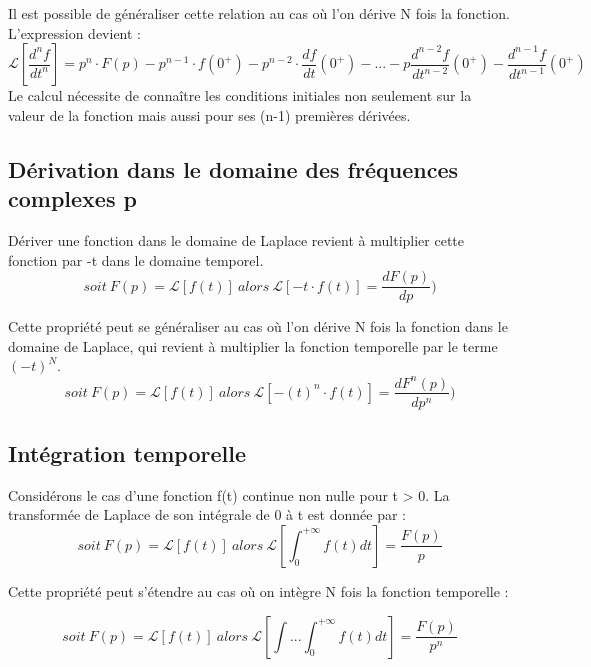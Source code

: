 	Il est possible de généraliser cette relation au cas où l'on dérive N
	fois la fonction. L'expression devient :
	\begin{equation}\label{key}
	\mathcal{L}[\frac{d^{n}f}{dt^{n}}] = p^{n}\cdot F(p)-p^{n-1}\cdot f(0^{+})-p^{n-2}\cdot \frac{df}{dt}(0^{+})-...-p\frac{d^{n-2}f}{dt^{n-2}}(0^{+})-\frac{d^{n-1}f}{dt^{n-1}}(0^{+})
	\end{equation}
	Le calcul nécessite de connaître les conditions initiales non seulement sur la valeur de la fonction mais aussi pour ses (n-1) premières dérivées.
	
	\subsection{Dérivation dans le domaine des fréquences complexes p}
	Dériver une fonction dans le domaine de Laplace revient à multiplier cette fonction par -t dans le domaine temporel.
	\begin{equation}\label{key}
		soit~F(p)=\mathcal{L}[f(t)]~alors~\mathcal{L}[-t\cdot f(t)] = \frac{dF(p)}{dp})
	\end{equation}
	
	Cette propriété peut se généraliser au cas où l'on dérive N fois la fonction dans le domaine de Laplace, qui revient à multiplier la fonction temporelle par le terme $(-t)^{N}$.
	\begin{equation}\label{key}
	soit~F(p)=\mathcal{L}[f(t)]~alors~\mathcal{L}[-(t)^{n}\cdot f(t)] = \frac{dF^{n}(p)}{dp^{n}})
	\end{equation}
	
	
	\subsection{Intégration temporelle}
	Considérons le cas d'une fonction f(t) continue non nulle pour t > 0. La transformée de Laplace de son intégrale de 0 à t est donnée par :
	\begin{equation}\label{key}
		soit~F(p)=\mathcal{L}[f(t)]~alors~\mathcal{L}[\int_{0}^{+\infty}f(t)dt]=\frac{F(p)}{p}	
	\end{equation}
	
	Cette propriété peut s'étendre au cas où on intègre N fois la fonction temporelle :
	
	\begin{equation}\label{key}
	soit~F(p)=\mathcal{L}[f(t)]~alors~\mathcal{L}[\int ... \int_{0}^{+\infty}f(t)dt]=\frac{F(p)}{p^{n}}	
	\end{equation}
	

